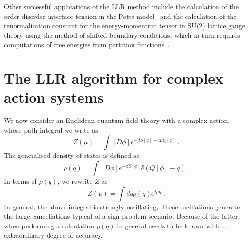 \documentclass[a4paper]{jpconf}
\begin{document}
Other successful applications of the LLR method include the calculation of
the order-disorder interface tension in the Potts model~\cite{Lucini:2016fid} and
the calculation of the renormalisation constant for the
energy-momentum tensor in SU(2) lattice gauge theory using the method
of shifted boundary conditions, which in turn requires computations of
free energies from partition functions~\cite{Pellegrini:2017iuy}. 

\section{The LLR algorithm for complex action systems}
\label{sect:complex}
We now consider an Euclidean quantum field theory with a complex action,
whose path integral we write as 
\begin{equation}
Z(\mu)=\int [ D \phi ] e^{-\beta S [ \phi ] + i \mu Q[\phi]} \ .
\end{equation}
The generalised density of states is defined as
\begin{equation}
\rho(q)=\int [ D \phi ]  e^{-\beta S [ \phi ]} \delta(Q[\phi]-q)  \ .
\end{equation}
In terms of $\rho(q)$, we rewrite $Z$ as
\begin{equation}
Z(\mu)=\int d q \rho(q) e^{i\mu  q} \ .
\end{equation}
In general, the above integral is strongly oscillating, These
oscillations generate the
large cancellations typical of a sign problem scenario. Because of the
latter, when performing a calculation $\rho(q)$ in
general needs to be known with an extraordinary degree of accuracy.
\end{document}
